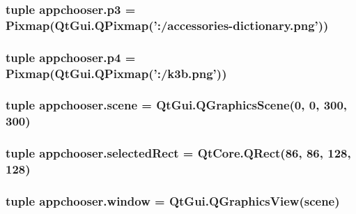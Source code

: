 \subsubsection[{p3}]{\setlength{\rightskip}{0pt plus 5cm}tuple appchooser.\+p3 = {\bf Pixmap}(Qt\+Gui.\+Q\+Pixmap('\+:/accessories-\/dictionary.\+png'))}\label{namespaceappchooser_a5b229def25670d69ce74fb6b77c1ca4e}
\hypertarget{namespaceappchooser_ad5d687a3909fca32f123761b1ee6402c}{}
\subsubsection[{p4}]{\setlength{\rightskip}{0pt plus 5cm}tuple appchooser.\+p4 = {\bf Pixmap}(Qt\+Gui.\+Q\+Pixmap('\+:/k3b.\+png'))}\label{namespaceappchooser_ad5d687a3909fca32f123761b1ee6402c}
\hypertarget{namespaceappchooser_a1c0abb0bd7ec56debeec97278c7ff008}{}
\subsubsection[{scene}]{\setlength{\rightskip}{0pt plus 5cm}tuple appchooser.\+scene = Qt\+Gui.\+Q\+Graphics\+Scene(0, 0, 300, 300)}\label{namespaceappchooser_a1c0abb0bd7ec56debeec97278c7ff008}
\hypertarget{namespaceappchooser_a44546cff85daaa95caf6e7be07f44317}{}
\subsubsection[{selected\+Rect}]{\setlength{\rightskip}{0pt plus 5cm}tuple appchooser.\+selected\+Rect = Qt\+Core.\+Q\+Rect(86, 86, 128, 128)}\label{namespaceappchooser_a44546cff85daaa95caf6e7be07f44317}
\hypertarget{namespaceappchooser_a6a1831720cdc572acdb574609029b6b0}{}
\subsubsection[{window}]{\setlength{\rightskip}{0pt plus 5cm}tuple appchooser.\+window = Qt\+Gui.\+Q\+Graphics\+View({\bf scene})}\label{namespaceappchooser_a6a1831720cdc572acdb574609029b6b0}
